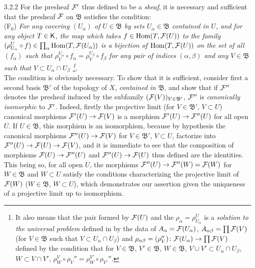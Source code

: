 \documentclass[../main.tex]{subfiles}
\begin{document}
\begin{env}{3.2.2}
For the presheaf $\mathcal{F}'$ thus defined to be a \emph{sheaf}, it is necessary and sufficient
that the presheaf $\mathcal{F}$ on $\mathfrak{B}$ satisfies the condition:\\

  (F$_0$) \emph{For any covering $(U_\alpha)$ of $U\in\mathfrak{B}$ by sets $U_\alpha\in\mathfrak{B}$
  contained in $U$, and for any object $T\in\mathsf{K}$, the map which takes $f\in\operatorname{Hom}(T,\mathcal{F}(U))$
  to the family $(\rho_{U_\alpha}^U\circ f)\in\prod_\alpha\operatorname{Hom}(T,\mathcal{F}(U_\alpha))$ is a bijection of
  $\operatorname{Hom}(T,\mathcal{F}(U))$ on the set of all $(f_\alpha)$ such that $\rho_V^{U_\alpha}\circ f_\alpha=\rho_V^{U_\beta}\circ f_\beta$
  for any pair of indices $(\alpha,\beta)$ and any $V\in\mathfrak{B}$ such that $V\subset U_\alpha\cap U_\beta$
  \footnote{It also means that the pair formed by $\mathcal{F}(U)$ and the $\rho_\alpha=\rho_{U_\alpha}^U$
  is a \emph{solution to the universal problem} defined in  by the data of $A_\alpha=\mathcal{F}(U_\alpha)$,
  $A_{\alpha\beta}=\prod\mathcal{F}(V)$ (for $V\in\mathfrak{B}$ such that $V\subset U_\alpha\cap U_\beta$) and
  $\rho_{\alpha\beta}=(\rho_V'')\colon\mathcal{F}(U_\alpha)\to\prod\mathcal{F}(V)$ defined by the condition that for
  $V\in\mathfrak{B}$, $V'\in\mathfrak{B}$, $W\in\mathfrak{B}$, $V\cup V'\subset U_\alpha\cap U_\beta$,
  $W\subset V\cap V'$, $\rho_W^V\circ\rho_V''=\rho_W^{V'}\circ\rho_{V'}''$.}.}\\

The condition is obviously necessary. To show that it is sufficient,
consider first a second basis $\mathfrak{B}'$ of the topology of $X$, \emph{contained in} $\mathfrak{B}$, and
show that if $\mathcal{F}''$ denotes the presheaf induced by the subfamily $(\mathcal{F}(V))_{V\in\mathfrak{B}'}$, $\mathcal{F}''$ is
\emph{canonically isomorphic} to $\mathcal{F}'$. Indeed, firstly the projective limit (for $V\in\mathfrak{B}'$,
$V\subset U$) canonical morphisms ${\mathcal{F}'(U)\to\mathcal{F}(V)}$ is a morphism ${\mathcal{F}'(U)\to\mathcal{F}''(U)}$
for all open $U$. If $U\in\mathfrak{B}$, this morphism is an isomorphism, because by hypothesis
the canonical morphisms ${\mathcal{F}''(U)\to\mathcal{F}(V)}$ for $V\in\mathfrak{B}'$, $V\subset U$, factorize into
${\mathcal{F}''(U)\to\mathcal{F}(U)\to\mathcal{F}(V)}$, and it is immediate to see that the composition of morphisms
${\mathcal{F}(U)\to\mathcal{F}''(U)}$ and ${\mathcal{F}''(U)\to\mathcal{F}(U)}$ thus defined are the identities. This being so, for
all open $U$, the morphisms ${\mathcal{F}''(U)\to\mathcal{F}''(W)=\mathcal{F}(W)}$ for $W\in\mathfrak{B}$ and $W\subset U$ satisfy
the conditions characterizing the projective limit of $\mathcal{F}(W)$ ($W\in\mathfrak{B}$, $W\subset U$), which demonstrates
our assertion given the uniqueness of a projective limit up to isomorphism.


\end{env}
\end{document}
